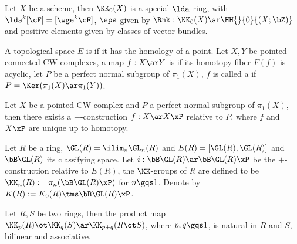 \documentclass[article, a4paper, twoside]{universal}
\begin{document}
\begin{thm}
    Let $X$ be a scheme, then $\KK_{0}(X)$ is a special $\lda$-ring, with $\lda^{k}[\cF]=[\wge^{k}\cF]$, $\eps$ given by $\Rnk:\KK_{0}(X)\ar\HH{}{0}{(X;\bZ)}$ and positive elements given by classes of vector bundles.
\end{thm}



\begin{dfn}
    A topological space $E$ is  if it has the homology of a point. Let $X,Y$ be pointed connected CW complexes, a map $f:X\ar Y$ is  if its homotopy fiber $F(f)$ is acyclic, let $P$ be a perfect normal subgroup of $\pi_{1}(X)$, $f$ is called a  if $P=\Ker(\pi_{1}(X)\ar\pi_{1}(Y))$.
\end{dfn}

\begin{thm}
    Let $X$ be a pointed CW complex and $P$ a perfect normal subgroup of $\pi_{1}(X)$, then there exists a $+$-construction $f:X\ar X\xP$ relative to $P$, where $f$ and $X\xP$ are unique up to homotopy.
\end{thm}

\begin{dfn}
    Let $R$ be a ring, $\GL(R)=\ilim_{n}\GL_{n}(R)$ and $E(R)=[\GL(R),\GL(R)]$ and $\bB\GL(R)$ its classifying space. Let $i:\bB\GL(R)\ar\bB\GL(R)\xP$ be the $+$-construction relative to $E(R)$, the $\KK$-groups of $R$ are defined to be $\KK_{n}(R):=\pi_{n}(\bB\GL(R)\xP)$ for $n\gqs1$. Denote by $K(R):=K_{0}(R)\tms\bB\GL(R)\xP$.
\end{dfn}

\begin{thm}
    Let $R,S$ be two rings, then the product map $\KK_{p}(R)\ot\KK_{q}(S)\ar\KK_{p+q}(R\ot S)$, where $p,q\gqs1$, is natural in $R$ and $S$, bilinear and associative.
\end{thm}
\end{document}

